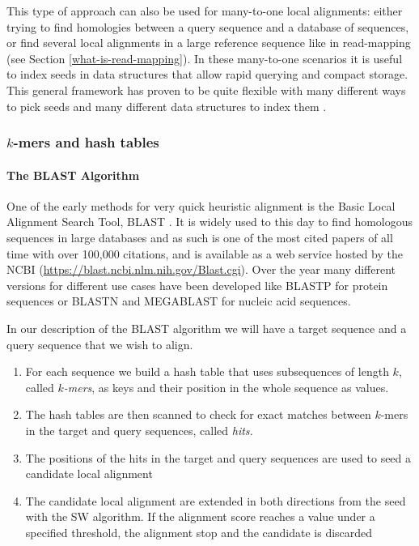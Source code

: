 \documentclass[
  11pt,
  twoside,
  BCOR=10mm,
  listof=totoc]{scrbook}
\providecommand{\tightlist}{%
  \setlength{\itemsep}{0pt}\setlength{\parskip}{0pt}}
\begin{document}
This type of approach can also be used for many-to-one local alignments: either trying to find homologies between a query sequence and a database of sequences, or find several local alignments in a large reference sequence like in read-mapping (see Section \ref{what-is-read-mapping}). In these many-to-one scenarios it is useful to index seeds in data structures that allow rapid querying and compact storage. This general framework has proven to be quite flexible with many different ways to pick seeds \autocite{sunChoosingBestHeuristic2006} and many different data structures to index them \autocite{liSurveySequenceAlignment2010}.

\hypertarget{k-mers-and-hash-tables}{%
\subsubsection{\texorpdfstring{\(k\)-mers and hash tables}{k-mers and hash tables}}\label{k-mers-and-hash-tables}}

\hypertarget{the-blast-algorithm}{%
\paragraph{The BLAST Algorithm}\label{the-blast-algorithm}}

One of the early methods for very quick heuristic alignment is the Basic Local Alignment Search Tool, BLAST \autocite{altschulBasicLocalAlignment1990}. It is widely used to this day to find homologous sequences in large databases and as such is one of the most cited papers of all time with over 100,000 citations, and is available as a web service hosted by the NCBI (\url{https://blast.ncbi.nlm.nih.gov/Blast.cgi}). Over the year many different versions for different use cases have been developed like BLASTP for protein sequences or BLASTN and MEGABLAST for nucleic acid sequences.

In our description of the BLAST algorithm we will have a target sequence and a query sequence that we wish to align.

\begin{enumerate}
\def\labelenumi{\arabic{enumi}.}
\tightlist
\item
  For each sequence we build a hash table that uses subsequences of length \(k\), called \(k\)\emph{-mers}, as keys and their position in the whole sequence as values.
\item
  The hash tables are then scanned to check for exact matches between \(k\)-mers in the target and query sequences, called \emph{hits.}
\item
  The positions of the hits in the target and query sequences are used to seed a candidate local alignment
\item
  The candidate local alignment are extended in both directions from the seed with the SW algorithm. If the alignment score reaches a value under a specified threshold, the alignment stop and the candidate is discarded
\end{enumerate}
\end{document}

